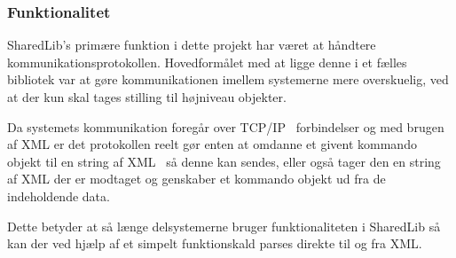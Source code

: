 \subsubsection{Funktionalitet}
SharedLib's primære funktion i dette projekt har været at håndtere kommunikationsprotokollen. Hovedformålet med at ligge denne i et fælles bibliotek var at gøre kommunikationen imellem systemerne mere overskuelig, ved at der kun skal tages stilling til højniveau objekter.

Da systemets kommunikation foregår over TCP/IP~\cite{TCPIP} forbindelser og med brugen af XML er det protokollen reelt gør enten at omdanne et givent kommando objekt til en string af XML~\cite{XML} så denne kan sendes, eller også tager den en string af XML der er modtaget og genskaber et kommando objekt ud fra de indeholdende data.

Dette betyder at så længe delsystemerne bruger funktionaliteten i SharedLib så kan der ved hjælp af et simpelt funktionskald parses direkte til og fra XML. 